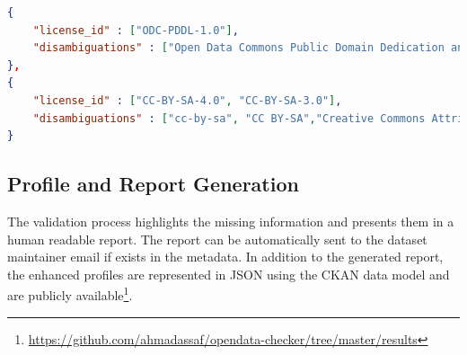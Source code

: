 \documentclass[runningheads,a4paper]{llncs}
\begin{document}
\begin{lstlisting}[language=json]
{
	"license_id" : ["ODC-PDDL-1.0"],
	"disambiguations" : ["Open Data Commons Public Domain Dedication and License (PDDL)"]
},
{
	"license_id" : ["CC-BY-SA-4.0", "CC-BY-SA-3.0"],
	"disambiguations" : ["cc-by-sa", "CC BY-SA","Creative Commons Attribution Share-Alike"]
}
\end{lstlisting}



\subsection{Profile and Report Generation}
The validation process highlights the missing information and presents them in a human readable report. The report can be automatically sent to the dataset maintainer email if exists in the metadata. In addition to the generated report, the enhanced profiles are represented in JSON using the CKAN data model and are publicly available\footnote{\url{https://github.com/ahmadassaf/opendata-checker/tree/master/results}}.
\end{document}
